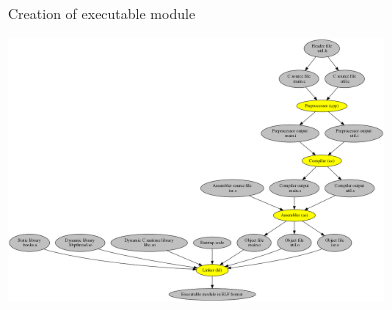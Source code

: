 \begin{frame}{Creation of executable module}
    \begin{center}
        \includegraphics[height=7cm]{01_flow.png}
    \end{center}
\end{frame}
